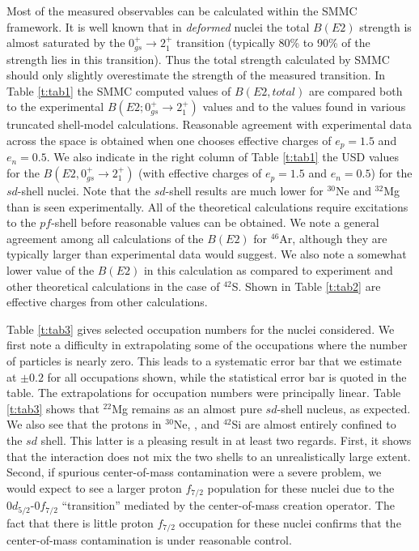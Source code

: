 \begin{multicols}{2}
Most of the measured observables can be calculated within the SMMC
framework.  It is well known that in {\it deformed} nuclei the total
$B(E2)$ strength is almost saturated by the $0^+_{gs} \rightarrow
2_1^+$ transition (typically 80\% to 90\% of the strength lies in this
transition).  Thus the total strength calculated by SMMC should only
slightly overestimate the strength of the measured transition.  In
Table \ref{t:tab1} the SMMC computed values of $B(E2, total)$ are
compared both to the experimental $B(E2; 0^+_{gs} \rightarrow 2^+_1)$
values and to the values found in various truncated shell-model
calculations.  Reasonable agreement with experimental data across the
space is obtained when one chooses effective charges of $e_p=1.5$ and
$e_n=0.5$. We also indicate in the right column of Table \ref{t:tab1}
the USD values for the $B(E2,0_{gs}^+ \rightarrow 2_1^+)$ (with
effective charges of $e_p=1.5$ and $e_n=0.5$) for the $sd$-shell
nuclei. Note that the $sd$-shell results are much lower for $^{30}$Ne
and $^{32}$Mg than is seen experimentally. All of the theoretical
calculations require excitations to the $pf$-shell before reasonable
values can be obtained.  We note a general agreement among all
calculations of the $B(E2)$ for $^{46}$Ar, although they are typically
larger than experimental data would suggest. We also note a somewhat
lower value of the $B(E2)$ in this calculation as compared to
experiment and other theoretical calculations in the case of $^{42}$S.
Shown in Table \ref{t:tab2} are effective charges from other
calculations.

Table \ref{t:tab3} gives selected occupation numbers for the nuclei
considered.  We first note a difficulty in extrapolating some of the
occupations where the number of particles is nearly zero.  This leads
to a systematic error bar that we estimate at $\pm 0.2$ for all
occupations shown, while the statistical error bar is quoted in the
table. The extrapolations for occupation numbers were principally
linear. Table \ref{t:tab3} shows that $^{22}$Mg remains as an almost
pure $sd$-shell nucleus, as expected.  We also see that the protons in
$^{30}$Ne, , and $^{42}$Si are almost entirely confined to the
$sd$ shell.  This latter is a pleasing result in at least two regards.
First, it shows that the interaction does not mix the two shells to an
unrealistically large extent.  Second, if spurious center-of-mass contamination
were a severe problem, we would expect to see a larger proton
$f_{7/2}$ population for these nuclei due to the $0d_{5/2}$-$0f_{7/2}$
``transition'' mediated by the center-of-mass creation operator.  The fact that
there is little proton $f_{7/2}$ occupation for these nuclei confirms
that the center-of-mass contamination is under reasonable control.


\end{multicols}
